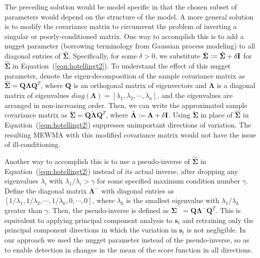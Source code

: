\documentclass[twoside,11pt]{article}
\begin{document}
The preceding solution would be model specific in that the chosen subset of parameters would depend on the structure of the model. A more general solution is to modify the covariance matrix to circumvent the problem of inverting a singular or poorly-conditioned matrix. One way to accomplish this is to add a nugget parameter (borrowing terminology from Gaussian process modeling) to all diagonal entries of $\hat {\bm { \Sigma}}$. Specifically, for some $\delta>0$, we substitute $\tilde {\bm { \Sigma}} \vcentcolon = \hat {\bm { \Sigma}}+ \delta \mathbf {I}$ for $\hat {\bm { \Sigma}}$ in Equation~(\ref{eqn:hotellingt2}). To understand the effect of this nugget parameter, denote the eigen-decomposition of the sample covariance matrix as $\hat {\bm { \Sigma}} = \mathbf {Q}\bm { \Lambda} \mathbf {Q}^T$, where $\mathbf {Q}$ is an orthogonal matrix of eigenvectors and $\bm{\Lambda}$ is a diagonal matrix of eigenvalues $ diag(\bm{\Lambda}) = [ \lambda_1, \lambda_2,\cdots, \lambda_n]$, and the eigenvalues are arranged in non-increasing order. Then, we can write the approximated sample covariance matrix as $\tilde {\bm { \Sigma}} = \mathbf {Q}\tilde{\bm { \Lambda}} \mathbf {Q}^T$, where $\tilde{\bm { \Lambda}} \vcentcolon= \bm { \Lambda} + \delta \mathbf {I}$. Using $\tilde{\bm{\Sigma}}$ in place of $\hat{\bm{\Sigma}}$ in Equation~(\ref{eqn:hotellingt2}) suppresses unimportant directions of variation. The resulting MEWMA with this modified covariance matrix would not have the issue of ill-conditioning. 

Another way to accomplish this is to use a pseudo-inverse of $\hat{\bm{\Sigma}}$ in Equation~(\ref{eqn:hotellingt2}) instead of its actual inverse, after dropping any eigenvalues $\lambda_i$ with $\lambda_1/\lambda_i>\gamma$ for some specified maximum condition number $\gamma$. Define the diagonal matrix $\bm { \Lambda} ^{-}$ with diagonal entries as $[1/\lambda_1,1/\lambda_2, \cdots, 1/\lambda_k, 0, \cdots, 0]$, where $\lambda_k$ is the smallest eigenvalue with $\lambda_1/\lambda_k$ greater than $\gamma$. Then, the pseudo-inverse is defined as $\hat {\bm { \Sigma}} ^{-} = \mathbf {Q}\bm { \Lambda}^{-}\mathbf {Q}^T$. This is equivalent to applying principal component analysis to $\bm{s}_t$ and retraining only the principal component directions in which the variation in $\bm{s}_t$ is not negligible. In our approach we used the nugget parameter instead of the pseudo-inverse, so as to enable detection in changes in the mean of the score function in all directions. 
\end{document}
